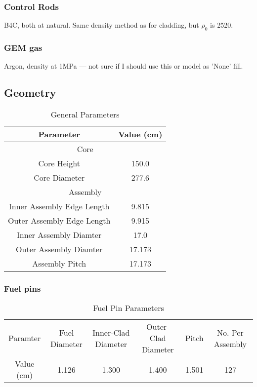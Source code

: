 \documentclass[11pt]{article}
\begin{document}
\subsubsection{Control Rods}

B4C, both at natural. Same density method as for cladding, but $\rho_0$ is 2520. 

\subsubsection{GEM gas}
Argon, density at 1MPa --- not sure if I should use this or model as 'None' fill.

\subsection{Geometry}

\begin{table}[htbp]
    \centering
    \caption{General Parameters}
    \begin{tabular}{cc}
        Parameter & Value (cm)\\
        \toprule
        \bottomrule
        \multicolumn{2}{c}{Core}\\
        \toprule
        \bottomrule
        Core Height  & 150.0 \\
        Core Diameter & 277.6\\
        \toprule
        \bottomrule
        \multicolumn{2}{c}{Assembly}\\
        \toprule
        \bottomrule
        Inner Assembly Edge Length & 9.815\\
        Outer Assembly Edge Length & 9.915\\
        Inner Assembly Diamter & 17.0 \\
        Outer Assembly Diamter & 17.173\\
        Assembly Pitch & 17.173\\
        \toprule
    \end{tabular}
\end{table}

\subsubsection{Fuel pins}
\begin{table}[htbp]
    \centering
    \caption{Fuel Pin Parameters}
    \begin{tabular}{cccccc}
        Paramter & Fuel Diameter & Inner-Clad Diameter & Outer-Clad Diameter & Pitch & No. Per Assembly\\
        Value (cm)& 1.126 & 1.300 & 1.400 & 1.501 & 127\\ 
        \toprule
    \end{tabular}
\end{table}
\end{document}
